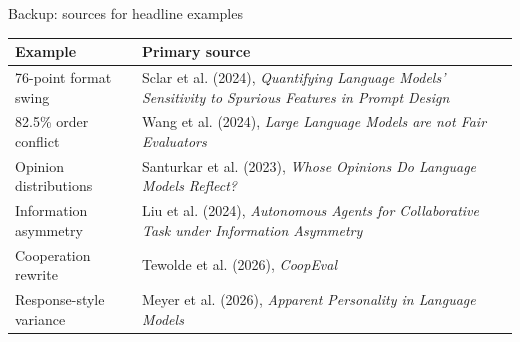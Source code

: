 \documentclass[aspectratio=169,10pt]{beamer}
\begin{document}
\begin{frame}{Backup: sources for headline examples}
  \footnotesize
  \begin{tabularx}{\textwidth}{p{3.0cm}X}
    \toprule
    Example & Primary source \\
    \midrule
    76-point format swing & Sclar et al. (2024), \emph{Quantifying Language Models' Sensitivity to Spurious Features in Prompt Design} \\
    82.5\% order conflict & Wang et al. (2024), \emph{Large Language Models are not Fair Evaluators} \\
    Opinion distributions & Santurkar et al. (2023), \emph{Whose Opinions Do Language Models Reflect?} \\
    Information asymmetry & Liu et al. (2024), \emph{Autonomous Agents for Collaborative Task under Information Asymmetry} \\
    Cooperation rewrite & Tewolde et al. (2026), \emph{CoopEval} \\
    Response-style variance & Meyer et al. (2026), \emph{Apparent Personality in Language Models} \\
    \bottomrule
  \end{tabularx}
\end{frame}
\end{document}
